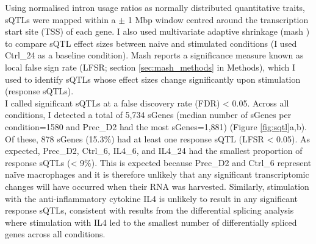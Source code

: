 Using normalised intron usage ratios as normally distributed quantitative traits, sQTLs were mapped within a $\pm$ 1 Mbp window centred around the transcription start site (TSS) of each gene. I also used multivariate adaptive shrinkage (mash \cite{Urbut2019-gf}) to compare sQTL effect sizes between naive and stimulated conditions (I used Ctrl\_24 as a baseline condition). Mash reports a significance measure known as local false sign rate (LFSR; section \ref{sec:mash_methods} in Methods), which I used to identify sQTLs whose effect sizes change significantly upon stimulation (response sQTLs). \\

I called significant sQTLs at a false discovery rate (FDR) < 0.05. Across all conditions, I detected a total of 5,734 sGenes (median number of sGenes per condition=1580 and Prec\_D2 had the most sGenes=1,881) (Figure \ref{fig:sqtl}a,b). Of these, 878 sGenes (15.3\%) had at least one response sQTL (LFSR < 0.05).  As expected, Prec\_D2, Ctrl\_6, IL4\_6, and IL4\_24 had the smallest proportion of response sQTLs (< 9\%). This is expected because Prec\_D2 and Ctrl\_6 represent naïve macrophages and it is therefore unlikely that any significant transcriptomic changes will have occurred when their RNA was harvested. Similarly, stimulation with the anti-inflammatory cytokine IL4 is unlikely to result in any significant response sQTLs, consistent with results from the differential splicing analysis where stimulation with IL4 led to the smallest number of differentially spliced genes across all conditions.\\

